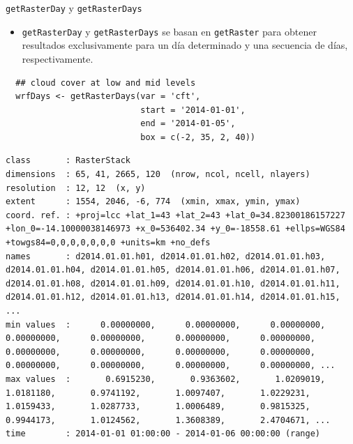 \documentclass[xcolor={usenames,svgnames,dvipsnames}]{beamer}
\begin{document}
\begin{frame}[fragile,label=sec-3-4]{\texttt{getRasterDay} y \texttt{getRasterDays}}
 \begin{itemize}
\item \texttt{getRasterDay} y \texttt{getRasterDays} se basan en \texttt{getRaster} para
obtener resultados exclusivamente para un día determinado y una
secuencia de días, respectivamente.
\end{itemize}

\lstset{language=R,label= ,caption= ,numbers=none}
\begin{lstlisting}
  ## cloud cover at low and mid levels
  wrfDays <- getRasterDays(var = 'cft',
                           start = '2014-01-01',
                           end = '2014-01-05',
                           box = c(-2, 35, 2, 40))
\end{lstlisting}

\begin{verbatim}
class       : RasterStack 
dimensions  : 65, 41, 2665, 120  (nrow, ncol, ncell, nlayers)
resolution  : 12, 12  (x, y)
extent      : 1554, 2046, -6, 774  (xmin, xmax, ymin, ymax)
coord. ref. : +proj=lcc +lat_1=43 +lat_2=43 +lat_0=34.82300186157227 +lon_0=-14.10000038146973 +x_0=536402.34 +y_0=-18558.61 +ellps=WGS84 +towgs84=0,0,0,0,0,0,0 +units=km +no_defs 
names       : d2014.01.01.h01, d2014.01.01.h02, d2014.01.01.h03, d2014.01.01.h04, d2014.01.01.h05, d2014.01.01.h06, d2014.01.01.h07, d2014.01.01.h08, d2014.01.01.h09, d2014.01.01.h10, d2014.01.01.h11, d2014.01.01.h12, d2014.01.01.h13, d2014.01.01.h14, d2014.01.01.h15, ... 
min values  :      0.00000000,      0.00000000,      0.00000000,      0.00000000,      0.00000000,      0.00000000,      0.00000000,      0.00000000,      0.00000000,      0.00000000,      0.00000000,      0.00000000,      0.00000000,      0.00000000,      0.00000000, ... 
max values  :       0.6915230,       0.9363602,       1.0209019,       1.0181180,       0.9741192,       1.0097407,       1.0229231,       1.0159433,       1.0287733,       1.0006489,       0.9815325,       0.9944173,       1.0124562,       1.3608389,       2.4704671, ... 
time        : 2014-01-01 01:00:00 - 2014-01-06 00:00:00 (range)
\end{verbatim}
\end{frame}

\begin{frame}[label=sec-3-5]{}
\end{frame}
\end{document}
